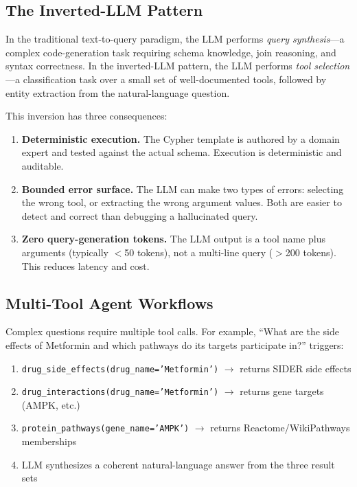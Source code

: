 \documentclass[sigconf, anonymous, review]{acmart}
\begin{document}
\subsection{The Inverted-LLM Pattern}

In the traditional text-to-query paradigm, the LLM performs
\emph{query synthesis}---a complex code-generation task requiring
schema knowledge, join reasoning, and syntax correctness.
In the inverted-LLM pattern, the LLM performs \emph{tool
selection}---a classification task over a small set of
well-documented tools, followed by entity extraction
from the natural-language question.

This inversion has three consequences:

\begin{enumerate}
\item \textbf{Deterministic execution.}  The Cypher template is
  authored by a domain expert and tested against the actual schema.
  Execution is deterministic and auditable.
\item \textbf{Bounded error surface.}  The LLM can make two
  types of errors: selecting the wrong tool, or extracting the
  wrong argument values.  Both are easier to detect and correct
  than debugging a hallucinated query.
\item \textbf{Zero query-generation tokens.}  The LLM output is
  a tool name plus arguments (typically $<$50 tokens), not a
  multi-line query ($>$200 tokens).  This reduces latency and cost.
\end{enumerate}

\subsection{Multi-Tool Agent Workflows}

Complex questions require multiple tool calls.  For example,
``What are the side effects of Metformin and which pathways do
its targets participate in?'' triggers:

\begin{enumerate}
\item \texttt{drug\_side\_effects(drug\_name='Metformin')}
  $\to$ returns SIDER side effects
\item \texttt{drug\_interactions(drug\_name='Metformin')}
  $\to$ returns gene targets (AMPK, etc.)
\item \texttt{protein\_pathways(gene\_name='AMPK')}
  $\to$ returns Reactome/WikiPathways memberships
\item LLM synthesizes a coherent natural-language answer
  from the three result sets
\end{enumerate}
\end{document}
